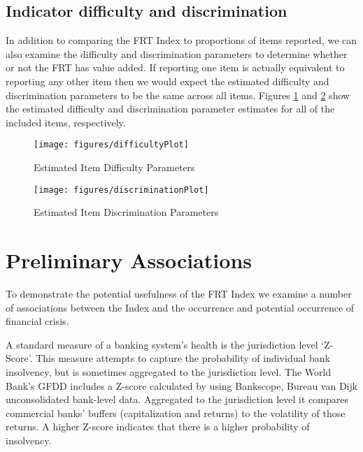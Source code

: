 \documentclass[a4paper]{article}
\begin{document}
\subsection{Indicator difficulty and discrimination}

In addition to comparing the FRT Index to proportions of items reported, we can also examine the difficulty and discrimination parameters to determine whether or not the FRT has value added. If reporting one item is actually equivalent to reporting any other item then we would expect the estimated difficulty and discrimination parameters to be the same across all items. Figures \ref{DifficultyFig} and \ref{DiscrimFig} show the estimated difficulty and discrimination parameter estimates for all of the included items, respectively. 


\begin{figure}
    \caption{Estimated Item Difficulty Parameters}
    \label{DifficultyFig}
    \begin{center}
        \texttt{[image: figures/difficultyPlot]}
    \end{center}
\end{figure}



\begin{figure}
    \caption{Estimated Item Discrimination Parameters}
    \label{DiscrimFig}
    \begin{center}
        \texttt{[image: figures/discriminationPlot]}
    \end{center}
\end{figure}


\section{Preliminary Associations}

To demonstrate the potential usefulness of the FRT Index we examine a number of associations between the Index and the occurrence and potential occurrence of financial crisis.


A standard measure of a banking system's health is the jurisdiction level `Z-Score'. This measure attempts to capture the probability of individual bank insolvency, but is sometimes aggregated to the jurisdiction level. The World Bank's GFDD includes a Z-score calculated by using Bankscope, Bureau van Dijk unconsolidated bank-level data. Aggregated to the jurisdiction level it compares commercial banks' buffers (capitalization and returns) to the volatility of those returns. A higher Z-score indicates that there is a higher probability of insolvency.
\end{document}
